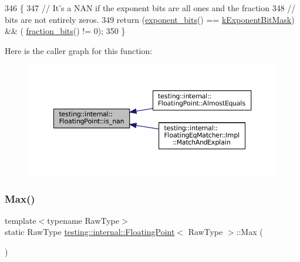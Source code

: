 \begin{DoxyCode}
346                       \{
347     \textcolor{comment}{// It's a NAN if the exponent bits are all ones and the fraction}
348     \textcolor{comment}{// bits are not entirely zeros.}
349     \textcolor{keywordflow}{return} (\hyperlink{classtesting_1_1internal_1_1FloatingPoint_af6bf8fab8df572ecb137a3516ff390ae}{exponent\_bits}() == \hyperlink{classtesting_1_1internal_1_1FloatingPoint_a66065dfc4d5f41100f686159637af23b}{kExponentBitMask}) && (
      \hyperlink{classtesting_1_1internal_1_1FloatingPoint_aa17337e50a2ac855719bc0676529558f}{fraction\_bits}() != 0);
350   \}
\end{DoxyCode}
Here is the caller graph for this function\+:
\nopagebreak
\begin{figure}[H]
\begin{center}
\leavevmode
\includegraphics[width=350pt]{classtesting_1_1internal_1_1FloatingPoint_a1fc654fd206efa98e480aa1e034f30d5_icgraph}
\end{center}
\end{figure}
\mbox{\label{classtesting_1_1internal_1_1FloatingPoint_aae5954d8a57d3ff0987c6930cb68e114}} 
\subsubsection{\texorpdfstring{Max()}{Max()}\hspace{0.1cm}{\footnotesize\ttfamily [1/3]}}
{\footnotesize\ttfamily template$<$typename Raw\+Type$>$ \\
static Raw\+Type \hyperlink{classtesting_1_1internal_1_1FloatingPoint}{testing\+::internal\+::\+Floating\+Point}$<$ Raw\+Type $>$\+::Max (\begin{DoxyParamCaption}{ }\end{DoxyParamCaption})\hspace{0.3cm}{\ttfamily [static]}}

